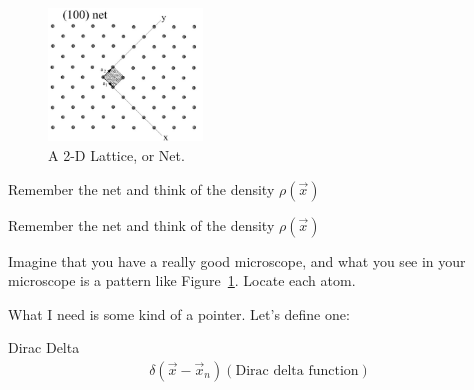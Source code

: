 \documentclass{article}
\begin{document}
\begin{section}{}

	\begin{figure}[h]
		\centering
		\includegraphics[height=100pt]{100plane2}
		\caption{A 2-D Lattice, or Net.}
		\label{fig:Net}
	\end{figure}
	Remember the net and think of the density $\rho(\vec{x})$

		Remember the net and think of the density $\rho(\vec{x})$
	
		Imagine that you have a really good microscope, and what you see in your microscope is a pattern like Figure~\ref{fig:Net}. Locate each atom.

		What I need is some kind of a pointer. Let's define one:
		\begin{subsection}{Dirac Delta}
		\begin{align*}
			\delta(\vec{x}-\vec{x}_n) (\text{Dirac delta function})
		\end{align*}


\end{subsection}
\end{section}
\end{document}
